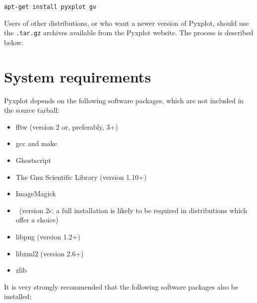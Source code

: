 \begin{verbatim}
apt-get install pyxplot gv
\end{verbatim}

Users of other distributions, or who want a newer version of Pyxplot, should
use the {\tt .tar.gz} archives available from the Pyxplot website. The process
is described below.

\section{System requirements}

Pyxplot depends on the following software packages, which are not included in
the source tarball:

\vspace{0.5cm}
\begin{itemize}
\item fftw (version 2 or, preferably, 3+) 
\item gcc and make
\item Ghostscript 
\item The Gnu Scientific Library (version 1.10+) 
\item ImageMagick 
\item \latexdcf\ (version $2\epsilon$; a full installation is likely to be required in distributions which offer a choice) 
\item libpng (version 1.2+) 
\item libxml2 (version 2.6+) 
\item zlib 
\end{itemize}
\vspace{0.5cm}

\noindent It is very strongly recommended that the following software packages
also be installed:

